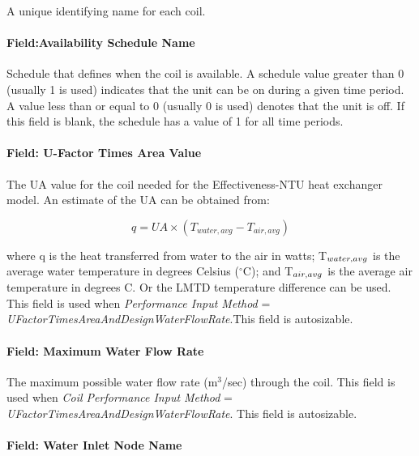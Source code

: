A unique identifying name for each coil.

\paragraph{Field:Availability Schedule Name}\label{fieldavailability-schedule-name-1-000}

Schedule that defines when the coil is available. A schedule value greater than 0 (usually 1 is used) indicates that the unit can be on during a given time period. A value less than or equal to 0 (usually 0 is used) denotes that the unit is off. If this field is blank, the schedule has a value of 1 for all time periods.

\paragraph{Field: U-Factor Times Area Value}\label{field-u-factor-times-area-value}

The UA value for the coil needed for the Effectiveness-NTU heat exchanger model. An estimate of the UA can be obtained from:

\begin{equation}
q = UA \times ({T_{water,avg}} - {T_{air,avg}})
\end{equation}

where q is the heat transferred from water to the air in watts; T\(_{water,\\ avg}\) is the average water temperature in degrees Celsius ($^\circ$C); and T\(_{air,\\ avg}\) is the average air temperature in degrees C. Or the LMTD temperature difference can be used. This field is used when \emph{Performance Input Method} = \emph{UFactorTimesAreaAndDesignWaterFlowRate}.This field is autosizable.

\paragraph{Field: Maximum Water Flow Rate}\label{field-maximum-water-flow-rate-000}

The maximum possible water flow rate (m\(^{3}\)/sec) through the coil. This field is used when \emph{Coil Performance Input Method} = \emph{UFactorTimesAreaAndDesignWaterFlowRate}. This field is autosizable.

\paragraph{Field: Water Inlet Node Name}\label{field-water-inlet-node-name-1-000}

